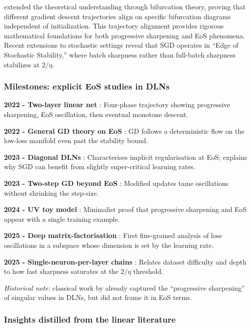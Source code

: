 \documentclass[11pt]{article}
\begin{document}
\citet{song2023trajectory} extended the theoretical understanding through bifurcation theory, proving that different gradient descent trajectories align on specific bifurcation diagrams independent of initialization. This trajectory alignment provides rigorous mathematical foundations for both progressive sharpening and EoS phenomena. Recent extensions to stochastic settings reveal that SGD operates in ``Edge of Stochastic Stability,'' where batch sharpness rather than full-batch sharpness stabilizes at $2/\eta$.

\subsubsection{Milestones: explicit EoS studies in DLNs}

\textbf{2022 - Two-layer linear net} \citep{Li2022SharpnessEoS}: Four-phase trajectory showing progressive sharpening, EoS oscillation, then eventual monotone descent.

\textbf{2022 - General GD theory on EoS} \citep{Arora2022Understanding}: GD follows a deterministic flow on the low-loss manifold even past the stability bound.

\textbf{2023 - Diagonal DLNs} \citep{Labarriere2024DiagonalDLN}: Characterises implicit regularisation at EoS; explains why SGD can benefit from slightly super-critical learning rates.

\textbf{2023 - Two-step GD beyond EoS} \citep{Chen2023TwoStep}: Modified updates tame oscillations without shrinking the step-size.

\textbf{2024 - UV toy model} \citep{Kalra2023Universal}: Minimalist proof that progressive sharpening and EoS appear with a single training example.

\textbf{2025 - Deep matrix-factorisation} \citep{Ghosh2025DeepMF}: First fine-grained analysis of loss oscillations in a subspace whose dimension is set by the learning rate.

\textbf{2025 - Single-neuron-per-layer chains} \citep{Yoo2025SingleNeuron}: Relates dataset difficulty and depth to how fast sharpness saturates at the $2/\eta$ threshold.

\vspace{0.5em}
\noindent
\emph{Historical note:} classical work by \citet{Saxe2013Exact} already
captured the ``progressive sharpening'' of singular values in DLNs, but
did not frame it in EoS terms.

\subsubsection{Insights distilled from the linear literature}
\end{document}
